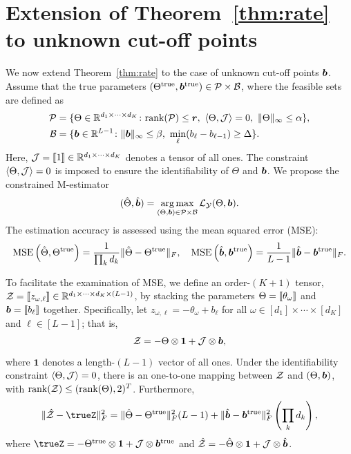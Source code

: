 \documentclass{article}
\theoremstyle{plain}
\theoremstyle{definition}
\begin{document}
\section{Extension of Theorem~\ref{thm:rate} to unknown cut-off points}\label{sec:extention}
We now extend Theorem~\ref{thm:rate} to the case of unknown cut-off points $\bm{b}$. Assume that the true parameters $(\Theta^{\text{true}}, \bm{b}^{\text{true}})\in \mathcal{P}\times \mathcal{B}$, where the feasible sets are defined as
\begin{align}
\tP&=\{\Theta\in\mathbb{R}^{d_1\times \cdots\times d_K}\colon \text{rank}(\tP)\leq \mr,\ \langle \Theta, \tJ \rangle=0,\ \mnormSize{}{\Theta}\leq \alpha\},\\
 \tB&=\{\mb\in\mathbb{R}^{L-1}\colon \mnormSize{}{\mb}\leq \beta,\ \min_{\ell}(b_\ell-b_{\ell-1}) \geq \Delta\}.
\end{align}
Here, $\mathcal{J}=\llbracket 1 \rrbracket\in\mathbb{R}^{d_1\times \cdots \times d_K}$ denotes a tensor of all ones. The constraint $\langle \Theta, \mathcal{J} \rangle=0$ is imposed to ensure the identifiability of $\Theta$ and $\bm{b}$. We propose the constrained M-estimator
\begin{equation}\label{eq:joint}
(\hat \Theta,\hat {\bm{b}})=\operatorname*{arg\,max}_{(\Theta,\bm{b})\in\mathcal{P}\times \mathcal{B}}\mathcal{L}_{\mathcal{Y}}(\Theta,\bm{b}).
\end{equation}
The estimation accuracy is assessed using the mean squared error (MSE):
\[
\text{MSE}\left( \hat \Theta, \Theta^{\text{true}} \right)={1\over \prod_k d_k}\lVert\hat \Theta-\Theta^{\text{true}}\rVert_F,\quad \text{MSE}\left( \hat {\bm{b}}, \bm{b}^{\text{true}} \right)={1\over L-1}\lVert\hat {\bm{b}}-\bm{b}^{\text{true}}\rVert_F.
\]

To facilitate the examination of MSE, we define an order-$(K+1)$ tensor, $\mathcal{Z}=\llbracket z_{\omega,\ell} \rrbracket\in\mathbb{R}^{d_1\times \cdots \times d_K\times (L-1)}$, by stacking the parameters $\Theta=\llbracket \theta_\omega \rrbracket$ and $\bm{b}=\llbracket b_\ell \rrbracket$ together. Specifically, let $z_{\omega,\ell}=-\theta_\omega+b_\ell$ for all $\omega\in[d_1]\times \cdots \times [d_K]$ and $\ell\in[L-1]$; that is,
\[
\mathcal{Z}=-\Theta\otimes \mathbf{1}+\mathcal{J}\otimes \bm{b},
\]
where $\mathbf{1}$ denotes a length-$(L-1)$ vector of all ones. Under the identifiability constraint $\langle \Theta, \mathcal{J} \rangle=0$, there is an one-to-one mapping between $\mathcal{Z}$ and $(\Theta, \bm{b})$, with $\text{rank}(\mathcal{Z})\leq (\text{rank}(\Theta),2)^T$. 
Furthermore, 
\begin{equation}\label{eq:decomp}
\FnormSize{}{\hat \tZ-\trueZ}^2=\FnormSize{}{\hat \Theta-\trueT}^2 (L-1)+\FnormSize{}{\hat \mb-\trueb}^2 \left(\prod_kd_k\right),
\end{equation}
where $\trueZ=-\trueT\otimes \mathbf{1}+\tJ\otimes \trueb$ and $\hat {\mathcal{Z}}=-\hat \Theta\otimes \mathbf{1}+\mathcal{J}\otimes \hat {\bm{b}}$. 
\end{document}
